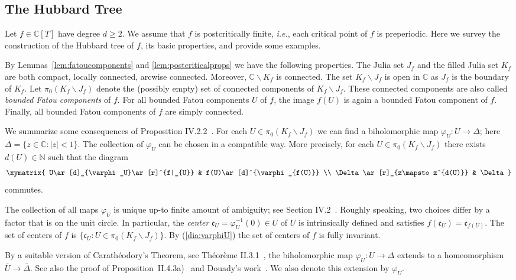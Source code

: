 \documentclass[12pt,oneside,a4]{amsart}
\newcommand{\IC}{\mathbb{C}}
\newcommand{\IN}{\mathbb{N}}
\numberwithin{maincounter}{section}
\numberwithin{equation}{section}
\newcommand{\ssm}{\smallsetminus}
\begin{document}
\subsection{The Hubbard Tree}
\label{sec:hubbard}

Let $f\in \IC[T]$ have degree $d \ge 2$. We assume that $f$ is
postcritically finite, \textit{i.e.}, each critical point of $f$ is
preperiodic. Here we survey the construction of the Hubbard tree of
$f$, its basic properties, and provide some examples.


By Lemmas~\ref{lem:fatoucomponents} and \ref{lem:postcriticalprops} we
have the following properties. The Julia set $J_f$ and the filled
Julia set $K_f$ are both compact, locally connected,
arcwise connected. Moreover, $\IC\ssm K_f$ is connected. The set
$K_f\ssm J_f$ is open in $\IC$ as $J_f$ is the boundary of $K_f$. Let
$\pi_0(K_f\ssm J_f)$ denote the (possibly empty) set of connected
components of $K_f\ssm J_f$. These connected components are also
called \emph{bounded Fatou components} of $f$. For all bounded Fatou
components $U$ of $f$, the image $f(U)$ is again a bounded Fatou
component of $f$. Finally, all bounded Fatou components of $f$ are
simply connected.

We summarize some consequences of Proposition
IV.2.2~\cite{DH:etudedynI}. For each $U\in \pi_0(K_f\ssm J_f)$ we can
find a biholomorphic map $\varphi_U \colon U\rightarrow \Delta$; here
$\Delta = \{z\in\IC : |z|<1\}$. The collection
of $\varphi_U$ can be chosen in a compatible way. More precisely, for
each $U\in\pi_0(K_f\ssm J_f)$ there exists $d(U)\in \IN$ such that the
diagram
\begin{equation}
  \label{dia:varphiU}
  \xymatrix{
    U\ar[d]_{\varphi_U}\ar[r]^{f|_{U}} & f(U)\ar[d]^{\varphi_{f(U)}}
    \\
    \Delta\ar[r]_{z\mapsto z^{d(U)}} & \Delta
  }
\end{equation}
commutes. 

The collection of all maps $\varphi_U$ is unique up-to finite amount
of ambiguity; see Section IV.2~\cite{DH:etudedynI}. Roughly speaking,
two choices differ by a factor that is on the unit circle. In
particular, the \textit{center} $\mathfrak{c}_U=\varphi_U^{-1}(0)\in
U$ of $U$ is intrinsically defined and satisfies
$f(\mathfrak{c}_U) = \mathfrak{c}_{f(U)}$.
The set of centers of $f$ is $\{\mathfrak{c}_U : U\in \pi_0(K_f\ssm
J_f)\}$.
By (\ref{dia:varphiU}) the set of centers of $f$ is fully invariant.  

By a suitable version of Carath\'eodory's Theorem, see Th\'eor\`eme
II.3.1~\cite{DH:etudedynI},  the 
biholomorphic map $\varphi_U \colon U\rightarrow \Delta$ extends to a
homeomorphism $\overline U \rightarrow\overline{\Delta}$.
See also the proof of Proposition~II.4.3a)~\cite{DH:etudedynI}
and Douady's work~\cite{Douady:compact}.
We also denote this extension by $\varphi_U$.
\end{document}
